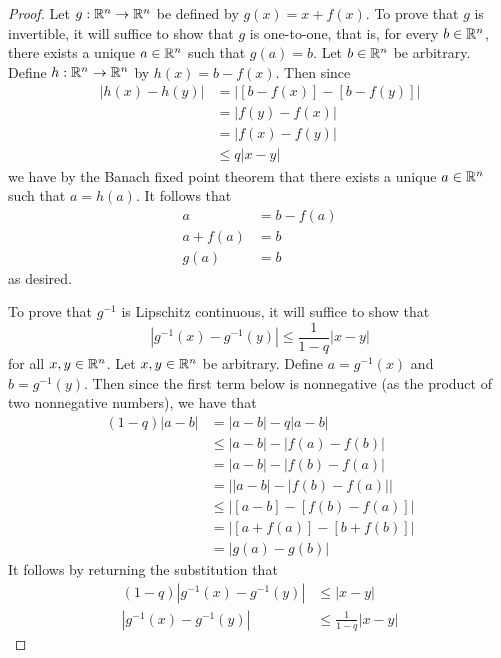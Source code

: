 \documentclass[../psets.tex]{subfiles}
\begin{document}
\begin{enumerate}
\begin{enumerate}
\begin{proof}
            Let $g:\mathbb{R}^n\to\mathbb{R}^n$ be defined by $g(x)=x+f(x)$. To prove that $g$ is invertible, it will suffice to show that $g$ is one-to-one, that is, for every $b\in\mathbb{R}^n$, there exists a unique $a\in\mathbb{R}^n$ such that $g(a)=b$. Let $b\in\mathbb{R}^n$ be arbitrary. Define $h:\mathbb{R}^n\to\mathbb{R}^n$ by $h(x)=b-f(x)$. Then since
            \begin{align*}
                |h(x)-h(y)| &= |[b-f(x)]-[b-f(y)]|\\
                &= |f(y)-f(x)|\\
                &= |f(x)-f(y)|\\
                &\leq q|x-y|
            \end{align*}
            we have by the Banach fixed point theorem that there exists a unique $a\in\mathbb{R}^n$ such that $a=h(a)$. It follows that
            \begin{align*}
                a &= b-f(a)\\
                a+f(a) &= b\\
                g(a) &= b
            \end{align*}
            as desired.\par
            To prove that $g^{-1}$ is Lipschitz continuous, it will suffice to show that
            \begin{equation*}
                |g^{-1}(x)-g^{-1}(y)| \leq \frac{1}{1-q}|x-y|
            \end{equation*}
            for all $x,y\in\mathbb{R}^n$. Let $x,y\in\mathbb{R}^n$ be arbitrary. Define $a=g^{-1}(x)$ and $b=g^{-1}(y)$. Then since the first term below is nonnegative (as the product of two nonnegative numbers), we have that
            \begin{align*}
                (1-q)|a-b| &= |a-b|-q|a-b|\\
                &\leq |a-b|-|f(a)-f(b)|\\
                &= |a-b|-|f(b)-f(a)|\\
                &= \big| |a-b|-|f(b)-f(a)| \big|\\
                &\leq |[a-b]-[f(b)-f(a)]|\\
                &= |[a+f(a)]-[b+f(b)]|\\
                &= |g(a)-g(b)|
            \end{align*}
            It follows by returning the substitution that
            \begin{align*}
                (1-q)|g^{-1}(x)-g^{-1}(y)| &\leq |x-y|\\
                |g^{-1}(x)-g^{-1}(y)| &\leq \frac{1}{1-q}|x-y|

\end{align*}
\end{proof}
\end{enumerate}
\end{enumerate}
\end{document}
